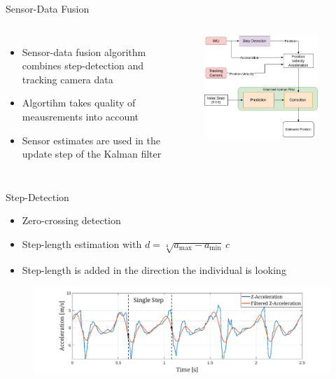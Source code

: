 \documentclass[aspectratio=169]{beamer}
\begin{document}
{	
	\begin{frame}{Sensor-Data Fusion}
		\begin{columns}
				\begin{itemize}
				\item Sensor-data fusion algorithm combines step-detection and tracking camera data
				\item Algortihm takes quality of meausrements into account
				\item Sensor estimates are used in the update step of the Kalman filter
			\end{itemize}
			\begin{figure}
				\centering
				\includegraphics[width=0.9\textwidth]{schema1.png}
			\end{figure}
		\end{columns}
	
	\end{frame}
	
		\begin{frame}{Step-Detection}
		\begin{itemize}
			\item Zero-crossing detection 
			\item Step-length estimation with $d = \sqrt[4]{a_{\max}-a_{\min}}  \, c$
			\item Step-length is added in the direction the individual is looking
		\end{itemize}
		
		\vspace{0.5cm}
		\begin{figure}
			\centering
			\includegraphics[width=0.9\linewidth]{../Conference_Paper/WalkAcceleration}
		\end{figure}
		

\end{frame}}
\end{document}
